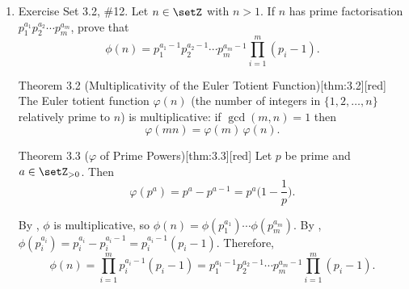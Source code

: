 \begin{enumerate}
\begin{enumerate}
\begin{define}{Theorem 3.1 (Multiplicative Functions and Divisor Sums)}[thm:3.1][red]
    Let $f$ be an arithmetic function and define, for $n\in\setZ_{>0}$,
    \[
    F(n):=\sum_{d\mid n, d>0} f(d).
    \]
    where $\sum_{d\mid n, d>0} f(d)$ is the sum of $f(d)$ over all  divisors $d$ of $n$ (i.e., $\sum_{d\mid 12} f(d)=f(1)+f(2)+f(3)+f(4)+f(6)+f(12)$).
    If $f$ is multiplicative, then $F$ is multiplicative.
    \end{define}
    \begin{subprove}
      Since $\lambda$ is completely multiplicative by part (a), by , $F$ is multiplicative.
      It suffices to evaluate $F$ at prime powers.
      
      For $p$ prime and $a \geq 1$, the divisors of $p^a$ are $1, p, p^2, \ldots, p^a$.
      By , $\lambda(p^k) = (-1)^k$ for $k \geq 0$.
      Thus $F(p^a) = \sum_{k=0}^a \lambda(p^k) = \sum_{k=0}^a (-1)^k$.
      
      If $a$ is even, then $F(p^a) = 1 + (-1) + 1 + \cdots + 1 = 1$.
      If $a$ is odd, then $F(p^a) = 1 + (-1) + 1 + \cdots + (-1) = 0$.
      
      For $n = p_1^{a_1} \cdots p_m^{a_m}$, since $F$ is multiplicative,
      $F(n) = F(p_1^{a_1}) \cdots F(p_m^{a_m})$.
      This equals $1$ if all $a_i$ are even (i.e., $n$ is a perfect square), and $0$ otherwise.
    \end{subprove}
  \end{enumerate}

  \newpage

  \item Exercise Set 3.2, \#12. Let $n \in \setZ$ with $n>1$. If $n$ has prime 
  factorisation $p_1^{a_1} p_2^{a_2} \cdots p_m^{a_m}$, prove that
  $$
  \phi(n)=p_1^{a_1-1} p_2^{a_2-1} \cdots p_m^{a_m-1} \prod_{i=1}^m\left(p_i-1\right) .
  $$ 
  \label{prob:3.2.12}
  \begin{define}{Theorem 3.2 (Multiplicativity of the Euler Totient Function)}[thm:3.2][red]
  The Euler totient function $\varphi(n)$ (the number of integers in $\{1,2,\dots,n\}$ relatively prime to $n$) is multiplicative: if $\gcd(m,n)=1$ then
  \[
  \varphi(mn)=\varphi(m)\,\varphi(n).
  \]
  \end{define}
  \begin{define}{Theorem 3.3 ($\varphi$ of Prime Powers)}[thm:3.3][red]
  Let $p$ be prime and $a\in\setZ_{>0}$. Then
  \[
  \varphi(p^a)=p^a-p^{a-1}=p^a\Big(1-\frac{1}{p}\Big).
  \]
  \end{define}
  \begin{subprove}
    By , $\phi$ is multiplicative, so $\phi(n) = \phi(p_1^{a_1}) \cdots \phi(p_m^{a_m})$.
    By , $\phi(p_i^{a_i}) = p_i^{a_i} - p_i^{a_i-1} = p_i^{a_i-1}(p_i - 1)$.
    Therefore,
    \[
    \phi(n) = \prod_{i=1}^m p_i^{a_i-1}(p_i - 1) = p_1^{a_1-1} p_2^{a_2-1} \cdots p_m^{a_m-1} \prod_{i=1}^m (p_i - 1).
    \]
  \end{subprove}


\end{enumerate}
